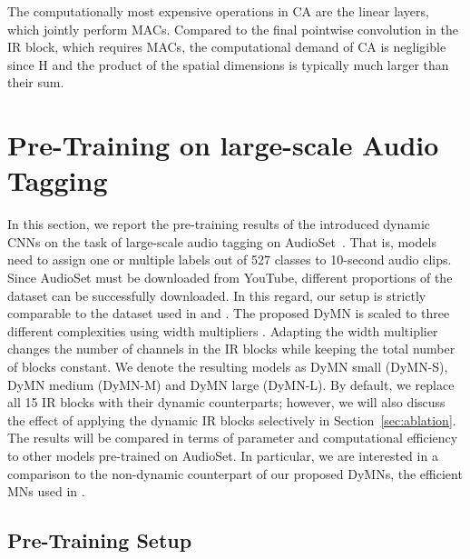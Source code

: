 \documentclass[lettersize,journal]{IEEEtran}
\begin{document}
The computationally most expensive operations in CA are the linear layers, which jointly perform  MACs. Compared to the final pointwise convolution in the IR block, which requires  MACs, the computational demand of CA is negligible since   H and the product of the spatial dimensions is typically much larger than their sum.




















\section{Pre-Training on large-scale Audio Tagging}
\label{sec:pre-training}

In this section, we report the pre-training results of the introduced dynamic CNNs on the task of large-scale audio tagging on AudioSet~\cite{audioset2017Gemmeke}. That is, models need to assign one or multiple labels out of 527 classes to 10-second audio clips. Since AudioSet must be downloaded from YouTube, different proportions of the dataset can be successfully downloaded. In this regard, our setup is strictly comparable to the dataset used in \cite{Koutini21Passt} and \cite{Schmid22Efficient}. The proposed DyMN is scaled to three different complexities using width multipliers . Adapting the width multiplier changes the number of channels in the IR blocks while keeping the total number of blocks constant. We denote the resulting models as DyMN small (DyMN-S), DyMN medium (DyMN-M) and DyMN large 
(DyMN-L). By default, we replace all 15 IR blocks with their dynamic counterparts; however, we will also discuss the effect of applying the dynamic IR blocks selectively in Section~\ref{sec:ablation}. The results will be compared in terms of parameter and computational efficiency to other models pre-trained on AudioSet. In particular, we are interested in a comparison to the non-dynamic counterpart of our proposed DyMNs, the efficient MNs used in \cite{Schmid22Efficient}.


\subsection{Pre-Training Setup}
\label{subsec:pre-training}
\end{document}
